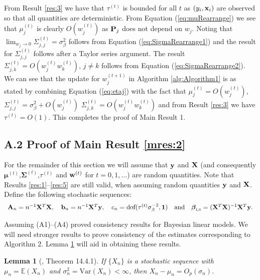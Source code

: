 \documentclass[11pt]{article}
\newtheorem{Lemma}{Lemma}
\newtheorem{Main Result}{Main Result}
\def\vectorfontone{\bf}
\def\vectorfonttwo{\boldsymbol}
\def\vb{{\vectorfontone b}}                      %
\def\vw{{\vectorfontone w}}                      %
\def\vx{{\vectorfontone x}}                      %
\def\vy{{\vectorfontone y}}                      %
\def\vone{{\vectorfontone 1}}
\def\vbeta{{\vectorfonttwo \beta}}               %
\def\vmu{{\vectorfonttwo \mu}}                   %
\def\matrixfontone{\bf}
\def\matrixfonttwo{\boldsymbol}
\def\mA{{\matrixfontone A}}                      %
\def\mP{{\matrixfontone P}}                      %
\def\mX{{\matrixfontone X}}                      %
\def\mSigma{{\matrixfonttwo \Sigma}}             %
\def\bE{{\mathbb E}}                             %
\newcommand{\cyc}[1]{{\color{black}#1}}
\begin{document}
\noindent
\cyc{From Result \cyc{\ref{res:3}} we have
	that $\tau^{(t)}$ is bounded for all $t$ as $(y_i,\vx_i)$ are observed
	so that all quantities are deterministic.
	From Equation (\ref{eq:muRearrange})
	we see that $\mu_j^{(t)}$ is clearly $O(w_j^{(t)})$ as $\mP_j$ does not depend on $w_j$. Noting that
	$\lim_{w_j\to 0} \Sigma^{(t)}_{j,j} = \sigma_\beta^2$ follows from Equation (\ref{eq:SigmaRearrange1})
	and
	the result for $\Sigma^{(t)}_{j,j}$ follows after a Taylor series argument.
	The result $\Sigma^{(t)}_{j,k} = O(w_j^{(t)}w_k^{(t)})$, $j\ne k$ follows from
	Equation (\ref{eq:SigmaRearrange2}).
	We can see that the update for $w_j^{(t+1)}$ in Algorithm \ref{alg:Algorithm1} is as stated
	by combining Equation (\ref{eq:etaj})
	with the fact that $\mu_j^{(t)} = O(w_j^{(t)})$,
	$\Sigma_{j,j}^{(t)} = \sigma_\beta^2 + O(w_j^{(t)})$
	$\Sigma_{j,k}^{(t)} = O(w_j^{(t)}w_k^{(t)})$ and
	from Result \ref{res:3} we have $\tau^{(t)} = O(1)$.
	This completes the proof of Main Result 1.}





\subsection*{A.2 Proof of Main Result \ref{mres:2}}\label{sec:proof2}

For the remainder of this section we will assume that $\vy$ and
$\mX$ (and consequently $\vmu^{(t)}$,$\mSigma^{(t)}$,$\tau^{(t)}$ and $\vw^{(t)}$ for $t=0,1,\ldots$) are random quantities. Note that Results \ref{res:1}--\ref{res:5} are still valid, when assuming random quantities $\vy$ and $\mX$. Define the following stochastic sequences:
\begin{equation}\label{eq:seqDefs}
\begin{array}{c}
\mA_n = n^{-1}\mX^T\mX, \quad
\vb_n = n^{-1}\mX^T\vy, \quad
c_n = \mbox{dof}(\tau^{(t)}\sigma_\beta^{-2},\vone)
\quad \mbox{and} \quad
\vbeta_{\mbox{\tiny LS}} = (\mX^T\mX)^{-1}\mX^T\vy.
\end{array}
\end{equation}

\noindent Assuming (A1)--(A4) \cite{You2014} proved
consistency results for Bayesian linear models.
We will need stronger results to prove consistency of the estimates
corresponding to Algorithm 2. Lemma \ref{lem:6} will aid in obtaining
these results.


\begin{Lemma}[\citealp{Bishop2007}, Theorem 14.4.1]\label{lem:6}
	If $\{ X_n \}$ is a
	stochastic sequence with $\mu_n=\bE(X_n)$ and
	$\sigma_n^2=\mbox{Var}(X_n)<\infty$, then $X_n - \mu_n = O_p(\sigma_n).$
\end{Lemma}
\end{document}
